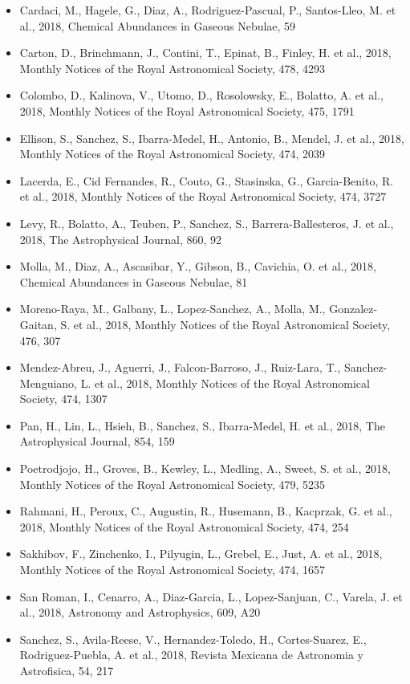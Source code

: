 \documentclass{letter}
\begin{document}
\begin{enumerate}
\begin{itemize}
\item Cardaci, M., Hagele, G., Diaz, A., Rodriguez-Pascual, P., Santos-Lleo, M. et al., 2018, Chemical Abundances in Gaseous Nebulae, 59
\item Carton, D., Brinchmann, J., Contini, T., Epinat, B., Finley, H. et al., 2018, Monthly Notices of the Royal Astronomical Society, 478, 4293
\item Colombo, D., Kalinova, V., Utomo, D., Rosolowsky, E., Bolatto, A. et al., 2018, Monthly Notices of the Royal Astronomical Society, 475, 1791
\item Ellison, S., Sanchez, S., Ibarra-Medel, H., Antonio, B., Mendel, J. et al., 2018, Monthly Notices of the Royal Astronomical Society, 474, 2039
\item Lacerda, E., Cid Fernandes, R., Couto, G., Stasinska, G., Garcia-Benito, R. et al., 2018, Monthly Notices of the Royal Astronomical Society, 474, 3727
\item Levy, R., Bolatto, A., Teuben, P., Sanchez, S., Barrera-Ballesteros, J. et al., 2018, The Astrophysical Journal, 860, 92
\item Molla, M., Diaz, A., Ascasibar, Y., Gibson, B., Cavichia, O. et al., 2018, Chemical Abundances in Gaseous Nebulae, 81
\item Moreno-Raya, M., Galbany, L., Lopez-Sanchez, A., Molla, M., Gonzalez-Gaitan, S. et al., 2018, Monthly Notices of the Royal Astronomical Society, 476, 307
\item Mendez-Abreu, J., Aguerri, J., Falcon-Barroso, J., Ruiz-Lara, T., Sanchez-Menguiano, L. et al., 2018, Monthly Notices of the Royal Astronomical Society, 474, 1307
\item Pan, H., Lin, L., Hsieh, B., Sanchez, S., Ibarra-Medel, H. et al., 2018, The Astrophysical Journal, 854, 159
\item Poetrodjojo, H., Groves, B., Kewley, L., Medling, A., Sweet, S. et al., 2018, Monthly Notices of the Royal Astronomical Society, 479, 5235
\item Rahmani, H., Peroux, C., Augustin, R., Husemann, B., Kacprzak, G. et al., 2018, Monthly Notices of the Royal Astronomical Society, 474, 254
\item Sakhibov, F., Zinchenko, I., Pilyugin, L., Grebel, E., Just, A. et al., 2018, Monthly Notices of the Royal Astronomical Society, 474, 1657
\item San Roman, I., Cenarro, A., Diaz-Garcia, L., Lopez-Sanjuan, C., Varela, J. et al., 2018, Astronomy and Astrophysics, 609, A20
\item Sanchez, S., Avila-Reese, V., Hernandez-Toledo, H., Cortes-Suarez, E., Rodriguez-Puebla, A. et al., 2018, Revista Mexicana de Astronomia y Astrofisica, 54, 217

\end{itemize}
\end{enumerate}
\end{document}
